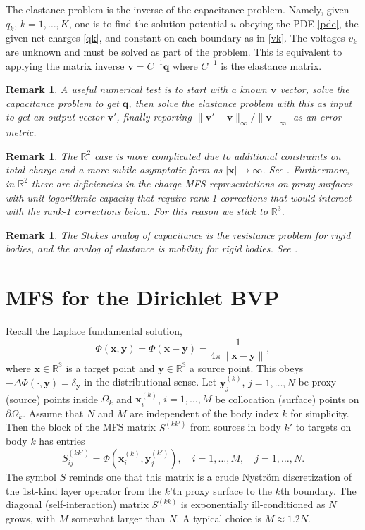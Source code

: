 \documentclass[10pt]{article}
\newcommand{\be}{\begin{equation}}
\newcommand{\ee}{\end{equation}}
\newcommand{\R}{\mathbb{R}}
\newtheorem{rmk}[thm]{Remark}
\newcommand{\x}{\mathbf{x}}
\newcommand{\y}{\mathbf{y}}
\newcommand{\vv}{\mathbf{v}}
\newcommand{\qq}{\mathbf{q}}
\newcommand{\pO}{\partial\Omega}
\newcommand{\ok}{^{(k)}}
\newcommand{\okp}{^{(k')}}
\begin{document}
The elastance problem is the inverse of the capacitance problem.
Namely, given $q_k$, $k=1,\dots,K$, one is to find
the solution potential $u$ obeying the PDE \eqref{pde},
the given net charges \eqref{qk}, and
constant on each boundary as in \eqref{vk}.
The voltages $v_k$ are unknown and must be solved as part of the problem.
This is equivalent to applying the matrix inverse
$\vv = C^{-1} \qq$ where $C^{-1}$ is the elastance matrix.

\begin{rmk}
A useful numerical test is to start with a known $\vv$ vector,
solve the capacitance problem to get $\qq$, then solve the elastance
problem with this as input to get an output vector $\vv'$,
finally reporting $\|\vv'-\vv\|_\infty/\|\vv\|_\infty$ as an error metric.
\end{rmk}

\begin{rmk}
  The $\R^2$ case is more complicated due to additional constraints
  on total charge and a more subtle asymptotic form as $|\x|\to\infty$.
  See \cite{mobility}.
  Furthermore, in $\R^2$ there are deficiencies in the charge
  MFS representations on proxy surfaces with unit logarithmic capacity
  \cite{qfs} that require rank-1 corrections that would interact with the
  rank-1 corrections below. For this reason we stick to $\R^3$.
  \end{rmk}

\begin{rmk}
  The Stokes analog of capacitance is the resistance problem for rigid bodies,
  and the analog of elastance is mobility for rigid bodies. See \cite{mobility}.
  \end{rmk}

\section{MFS for the Dirichlet BVP}

Recall the Laplace fundamental solution,
\be
\Phi(\x,\y) = \Phi(\x-\y) = \frac{1}{4\pi \|\x-\y\|},
\ee
where $\x\in\R^3$ is a target point and $\y\in\R^3$ a source point.
This obeys $-\Delta \Phi(\cdot,\y) = \delta_\y$ in the distributional
sense.
Let $\y\ok_j$, $j=1,\dots,N$ be proxy (source) points inside $\Omega_k$
and $\x\ok_i$, $i=1,\dots,M$ be collocation (surface) points on $\pO_k$.
Assume that $N$ and $M$ are independent of the body index $k$ for simplicity.
Then the block of the MFS matrix $S^{(kk')}$
from sources in body $k'$ to targets on body $k$
has entries
\be
S^{(kk')}_{ij} = \Phi(\x\ok_i,\y\okp_j), \quad i=1,\dots,M, \quad j=1,\dots,N.
\ee
The symbol $S$ reminds one that this matrix is a crude Nystr\"om
discretization of the 1st-kind layer operator from the $k$'th proxy surface
to the $k$th boundary.
The diagonal (self-interaction) matrix $S^{(kk)}$
is exponentially ill-conditioned as $N$ grows, with $M$ somewhat
larger than $N$. A typical choice is $M\approx 1.2 N$.
\end{document}
